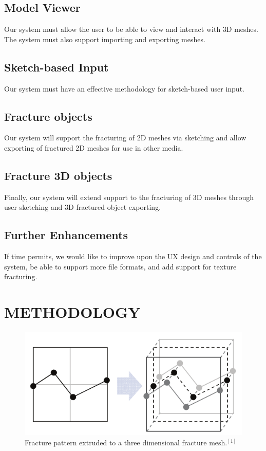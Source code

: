 \documentclass[titlepage, 11pt]{article}
\begin{document}
\subsection{Model Viewer}
Our system must allow the user to be able to view and interact with 3D meshes. The system must also support importing and exporting meshes.
\subsection{Sketch-based Input}
Our system must have an effective methodology for sketch-based user input.
\subsection{Fracture objects}
Our system will support the fracturing of 2D meshes via sketching and allow exporting of fractured 2D meshes for use in other media.
\subsection{Fracture 3D objects}
Finally, our system will extend support to the fracturing of 3D meshes through user sketching and 3D fractured object exporting.
\subsection{Further Enhancements}
If time permits, we would like to improve upon the UX design and controls of the system, be able to support more file formats, and add support for texture fracturing.

\section{METHODOLOGY}
\begin{figure}[h]
\begin{measuredfigure}
\includegraphics[scale=0.5]{fracture_pattern.png}
\caption{Fracture pattern extruded to a three dimensional fracture mesh.$^{[1]}$}
\end{measuredfigure}
\end{figure}
\end{document}
